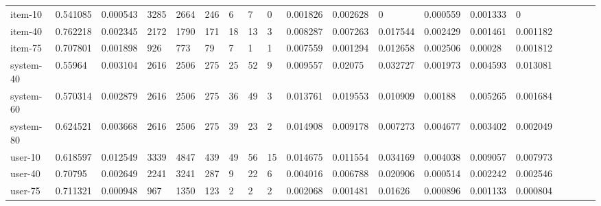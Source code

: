 \begin{table}
{\begin{tabular}{*{19}l}
item-10		&	0.541085 &	0.000543 &	3285 &	2664 &	246 &	6 &	7 &	0 &	0.001826 &	0.002628 &	0 &	0.000559 &	0.001333 &	0 &	 \\
item-40		&	0.762218 &	0.002345 &	2172 &	1790 &	171 &	18 &	13 &	3 &	0.008287 &	0.007263 &	0.017544 &	0.002429 &	0.001461 &	0.001182 &	 \\
item-75		&	0.707801 &	0.001898 &	926 &	773 &	79 &	7 &	1 &	1 &	0.007559 &	0.001294 &	0.012658 &	0.002506 &	0.00028 &	0.001812 &	 \\
system-40	&	0.55964  &	0.003104 &	2616 &	2506 &	275 &	25 &	52 &	9 &	0.009557 &	0.02075 &	0.032727 &	0.001973 &	0.004593 &	0.013081 &	 \\
system-60	&	0.570314 &	0.002879 &	2616 &	2506 &	275 &	36 &	49 &	3 &	0.013761 &	0.019553 &	0.010909 &	0.00188 &	0.005265 &	0.001684 &	 \\
system-80	&	0.624521 &	0.003668 &	2616 &	2506 &	275 &	39 &	23 &	2 &	0.014908 &	0.009178 &	0.007273 &	0.004677 &	0.003402 &	0.002049 &	 \\
user-10		&	0.618597 &	0.012549 &	3339 &	4847 &	439 &	49 &	56 &	15 &	0.014675 &	0.011554 &	0.034169 &	0.004038 &	0.009057 &	0.007973 &	 \\
user-40		&	0.70795  &	0.002649 &	2241 &	3241 &	287 &	9 &	22 &	6 &	0.004016 &	0.006788 &	0.020906 &	0.000514 &	0.002242 &	0.002546 &	 \\
user-75		&	0.711321 &	0.000948 &	967 &	1350 &	123 &	2 &	2 &	2 &	0.002068 &	0.001481 &	0.01626 &	0.000896 &	0.001133 &	0.000804 &	 \\


\end{tabular}}
\end{table}
